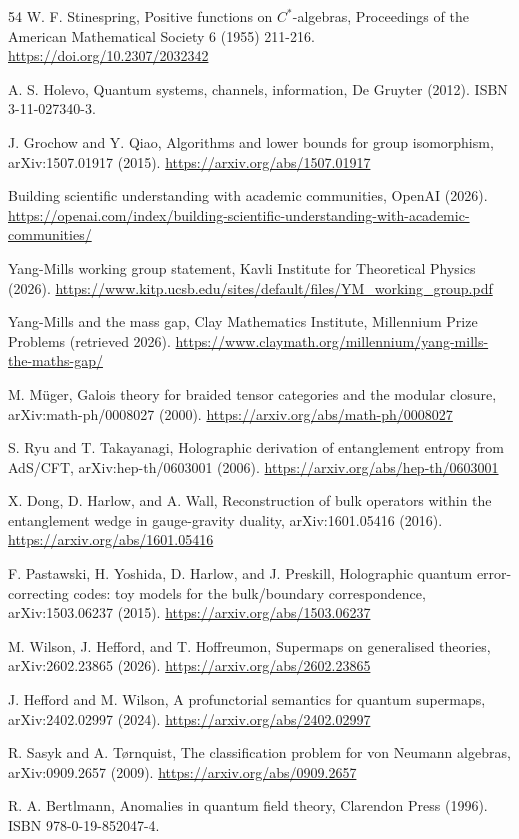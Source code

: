 \documentclass[11pt,letterpaper]{article}
\theoremstyle{definition}
\theoremstyle{remark}
\begin{document}
\begin{thebibliography}{54}
 W. F. Stinespring, Positive functions on $C^*$-algebras, Proceedings of the American Mathematical Society 6 (1955) 211-216. \url{https://doi.org/10.2307/2032342}

 A. S. Holevo, Quantum systems, channels, information, De Gruyter (2012). ISBN 3-11-027340-3.

 J. Grochow and Y. Qiao, Algorithms and lower bounds for group isomorphism, arXiv:1507.01917 (2015). \url{https://arxiv.org/abs/1507.01917}

 Building scientific understanding with academic communities, OpenAI (2026). \url{https://openai.com/index/building-scientific-understanding-with-academic-communities/}

 Yang-Mills working group statement, Kavli Institute for Theoretical Physics (2026). \url{https://www.kitp.ucsb.edu/sites/default/files/YM_working_group.pdf}

 Yang-Mills and the mass gap, Clay Mathematics Institute, Millennium Prize Problems (retrieved 2026). \url{https://www.claymath.org/millennium/yang-mills-the-maths-gap/}

 M. M\"uger, Galois theory for braided tensor categories and the modular closure, arXiv:math-ph/0008027 (2000). \url{https://arxiv.org/abs/math-ph/0008027}

 S. Ryu and T. Takayanagi, Holographic derivation of entanglement entropy from AdS/CFT, arXiv:hep-th/0603001 (2006). \url{https://arxiv.org/abs/hep-th/0603001}

 X. Dong, D. Harlow, and A. Wall, Reconstruction of bulk operators within the entanglement wedge in gauge-gravity duality, arXiv:1601.05416 (2016). \url{https://arxiv.org/abs/1601.05416}

 F. Pastawski, H. Yoshida, D. Harlow, and J. Preskill, Holographic quantum error-correcting codes: toy models for the bulk/boundary correspondence, arXiv:1503.06237 (2015). \url{https://arxiv.org/abs/1503.06237}

 M. Wilson, J. Hefford, and T. Hoffreumon, Supermaps on generalised theories, arXiv:2602.23865 (2026). \url{https://arxiv.org/abs/2602.23865}

 J. Hefford and M. Wilson, A profunctorial semantics for quantum supermaps, arXiv:2402.02997 (2024). \url{https://arxiv.org/abs/2402.02997}

 R. Sasyk and A. T\o rnquist, The classification problem for von Neumann algebras, arXiv:0909.2657 (2009). \url{https://arxiv.org/abs/0909.2657}

 R. A. Bertlmann, Anomalies in quantum field theory, Clarendon Press (1996). ISBN 978-0-19-852047-4.

\end{thebibliography}
\end{document}
